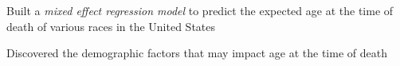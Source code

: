 \documentclass[]{resume-openfont}
\begin{document}
\begin{minipage}[t]{0.66\textwidth}
\descript{}
\begin{tightemize}
\item Built a \emph{mixed effect regression model} to predict the expected age at the time of death of various races in the United States
\item Discovered the demographic factors that may impact age at the time of death
\end{tightemize}
\sectionsep


\end{minipage} 
\end{document}
